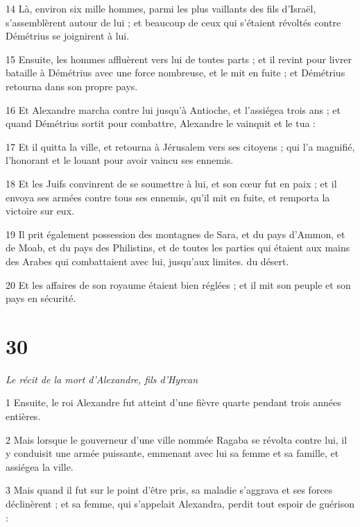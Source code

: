 \par 14 Là, environ six mille hommes, parmi les plus vaillants des fils d'Israël, s'assemblèrent autour de lui ; et beaucoup de ceux qui s'étaient révoltés contre Démétrius se joignirent à lui.

\par 15 Ensuite, les hommes affluèrent vers lui de toutes parts ; et il revint pour livrer bataille à Démétrius avec une force nombreuse, et le mit en fuite ; et Démétrius retourna dans son propre pays.

\par 16 Et Alexandre marcha contre lui jusqu'à Antioche, et l'assiégea trois ans ; et quand Démétrius sortit pour combattre, Alexandre le vainquit et le tua :

\par 17 Et il quitta la ville, et retourna à Jérusalem vers ses citoyens ; qui l'a magnifié, l'honorant et le louant pour avoir vaincu ses ennemis.

\par 18 Et les Juifs convinrent de se soumettre à lui, et son cœur fut en paix ; et il envoya ses armées contre tous ses ennemis, qu'il mit en fuite, et remporta la victoire sur eux.

\par 19 Il prit également possession des montagnes de Sara, et du pays d'Ammon, et de Moab, et du pays des Philistins, et de toutes les parties qui étaient aux mains des Arabes qui combattaient avec lui, jusqu'aux limites. du désert.

\par 20 Et les affaires de son royaume étaient bien réglées ; et il mit son peuple et son pays en sécurité.

\chapter{30}

\par \textit{Le récit de la mort d'Alexandre, fils d'Hyrcan}

\par 1 Ensuite, le roi Alexandre fut atteint d'une fièvre quarte pendant trois années entières.

\par 2 Mais lorsque le gouverneur d'une ville nommée Ragaba se révolta contre lui, il y conduisit une armée puissante, emmenant avec lui sa femme et sa famille, et assiégea la ville.

\par 3 Mais quand il fut sur le point d'être pris, sa maladie s'aggrava et ses forces déclinèrent ; et sa femme, qui s'appelait Alexandra, perdit tout espoir de guérison :

